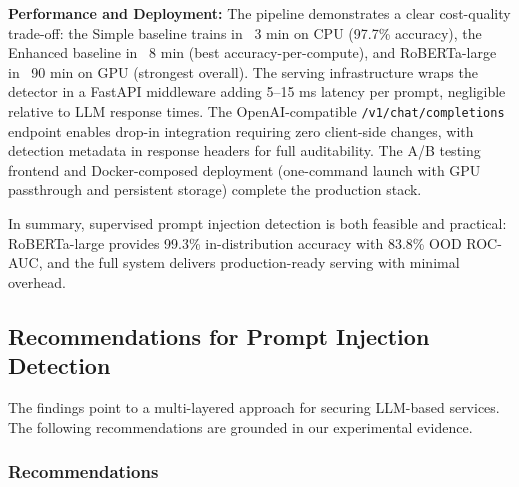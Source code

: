 \documentclass[12pt, letterpaper]{article}   %
\begin{document}
\textbf{Performance and Deployment:} The pipeline demonstrates a clear cost-quality trade-off: the Simple baseline trains in ~3 min on CPU (97.7\% accuracy), the Enhanced baseline in ~8 min (best accuracy-per-compute), and RoBERTa-large in ~90 min on GPU (strongest overall). The serving infrastructure wraps the detector in a FastAPI middleware adding 5--15 ms latency per prompt, negligible relative to LLM response times. The OpenAI-compatible \texttt{/v1/chat/completions} endpoint enables drop-in integration requiring zero client-side changes, with detection metadata in response headers for full auditability. The A/B testing frontend and Docker-composed deployment (one-command launch with GPU passthrough and persistent storage) complete the production stack.

In summary, supervised prompt injection detection is both feasible and practical: RoBERTa-large provides 99.3\% in-distribution accuracy with 83.8\% OOD ROC-AUC, and the full system delivers production-ready serving with minimal overhead.


\subsection{Recommendations for Prompt Injection Detection}

The findings point to a multi-layered approach for securing LLM-based services. The following recommendations are grounded in our experimental evidence.

\subsubsection{Recommendations}
\end{document}
